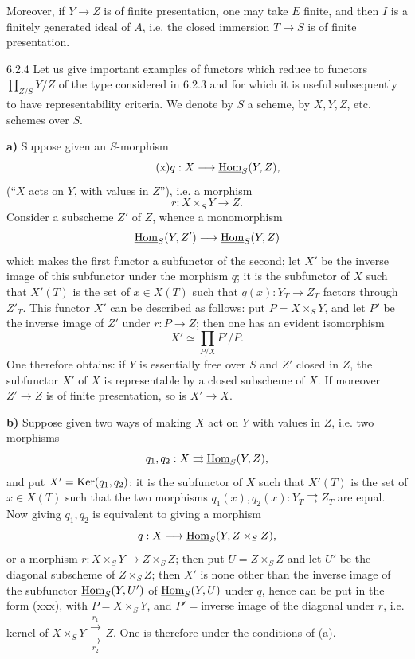 Moreover, if $Y\to Z$ is of finite presentation, one may take $E$ finite, and then $I$ is a finitely generated ideal of $A$, i.e. the closed immersion $T\to S$ is of finite presentation.
\begin{examples}{6.2.4}\label{VIB.6.2.4}
Let us give important examples of functors which reduce to functors $\prod_{Z/S}Y/Z$ of the type considered in 6.2.3 and for which it is useful subsequently to have representability criteria. We denote by $S$ a scheme, by $X,Y,Z$, etc. schemes over $S$.

\textbf{a)} Suppose given an $S$-morphism
\[
\tag{x}q:X\longrightarrow\underline{\operatorname{Hom}}_S(Y,Z),
\]
(``$X$ acts on $Y$, with values in $Z$''), i.e. a morphism
\[
\tag{xx}r:X\times_SY\longrightarrow Z.
\]
Consider a subscheme $Z'$ of $Z$, whence a monomorphism
\[
\underline{\operatorname{Hom}}_S(Y,Z')\longrightarrow\underline{\operatorname{Hom}}_S(Y,Z)
\]
which makes the first functor a subfunctor of the second; let $X'$ be the inverse image of this subfunctor under the morphism $q$; it is the subfunctor of $X$ such that $X'(T)$ is the set of $x\in X(T)$ such that $q(x):Y_T\to Z_T$ factors through $Z'_T$. This functor $X'$ can be described as follows: put $P=X\times_SY$, and let $P'$ be the inverse image of $Z'$ under $r:P\to Z$; then one has an evident isomorphism
\[
\tag{xxx}X'\simeq\prod_{P/X}P'/P.
\]
One therefore obtains: if $Y$ is essentially free over $S$ and $Z'$ closed in $Z$, the subfunctor $X'$ of $X$ is representable by a closed subscheme of $X$. If moreover $Z'\to Z$ is of finite presentation, so is $X'\to X$.

\textbf{b)} Suppose given two ways of making $X$ act on $Y$ with values in $Z$, i.e. two morphisms
\[
q_1,q_2:X\rightrightarrows\underline{\operatorname{Hom}}_S(Y,Z),
\]
and put $X'=\operatorname{Ker}(q_1,q_2)$: it is the subfunctor of $X$ such that $X'(T)$ is the set of $x\in X(T)$ such that the two morphisms $q_1(x),q_2(x):Y_T\rightrightarrows Z_T$ are equal. Now giving $q_1,q_2$ is equivalent to giving a morphism
\[
q:X\longrightarrow\underline{\operatorname{Hom}}_S(Y,Z\times_SZ),
\]
or a morphism $r:X\times_SY\to Z\times_SZ$; then put $U=Z\times_SZ$ and let $U'$ be the diagonal subscheme of $Z\times_SZ$; then $X'$ is none other than the inverse image of the subfunctor $\underline{\operatorname{Hom}}_S(Y,U')$ of $\underline{\operatorname{Hom}}_S(Y,U)$ under $q$, hence can be put in the form (xxx), with $P=X\times_SY$, and $P'={}$inverse image of the diagonal under $r$, i.e. kernel of $X\times_SY\mathrel{\substack{\xrightarrow{r_1}\\[-.6ex]\xrightarrow[r_2]{}}}Z$. One is therefore under the conditions of (a).


\end{examples}
